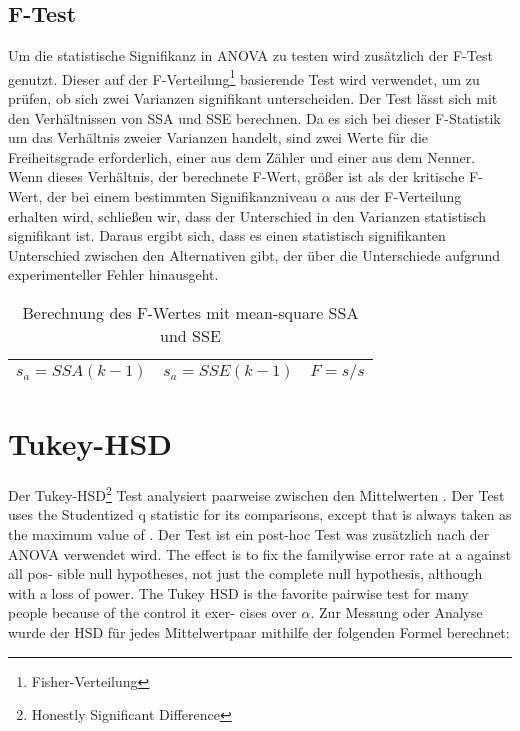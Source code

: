 \subsection{F-Test}
Um die statistische Signifikanz in ANOVA zu testen wird zusätzlich der F-Test genutzt.
Dieser auf der F-Verteilung\footnote{Fisher-Verteilung} basierende Test wird verwendet, um zu prüfen, ob sich zwei Varianzen signifikant unterscheiden.
Der Test lässt sich mit den Verhältnissen von SSA und SSE berechnen.
Da es sich bei dieser F-Statistik um das Verhältnis zweier Varianzen handelt, sind zwei Werte für die Freiheitsgrade erforderlich, 
einer aus dem Zähler und einer aus dem Nenner.
Wenn dieses Verhältnis, der berechnete F-Wert, größer ist als der kritische F-Wert, der bei einem bestimmten Signifikanzniveau $\alpha$ aus der F-Verteilung erhalten wird, 
schließen wir, dass der Unterschied in den Varianzen statistisch signifikant ist. Daraus ergibt sich, 
dass es einen statistisch signifikanten Unterschied zwischen den Alternativen gibt, der über die Unterschiede aufgrund experimenteller Fehler hinausgeht.

\begin{center}
  \begin{table}[h!]
    \begin{tabularx}{\textwidth}{|X|X|X|}
      \hline
       $s_a = SSA ( k -1)$ & $s_a = SSE ( k -1)$ & $F = s/s$\\ 
      \hline
    \end{tabularx}
    \caption{Berechnung des F-Wertes mit mean-square SSA und SSE}
    \label{tab:f_computing}
  \end{table}
\end{center}


\section{Tukey-HSD}
Der Tukey-HSD\footnote{Honestly Significant Difference} Test analysiert paarweise
zwischen den Mittelwerten \cite{tukey_HSD}.
Der Test uses the Studentized q statistic for its comparisons, except that is always taken as the
maximum value of .
Der Test ist ein post-hoc Test was zusätzlich nach der ANOVA verwendet wird.
The effect is to fix the familywise error rate at a against all pos-
sible null hypotheses, not just the complete null hypothesis, although with a loss of power.
The Tukey HSD is the favorite pairwise test for many people because of the control it exer-
cises over $\alpha$.
Zur Messung oder Analyse wurde der HSD für jedes
Mittelwertpaar mithilfe der folgenden Formel berechnet:

